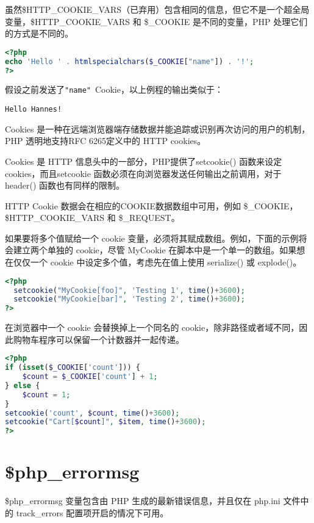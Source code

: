 虽然\$HTTP\_COOKIE\_VARS（已弃用）包含相同的信息，但它不是一个超全局变量，\$HTTP\_COOKIE\_VARS 和 \$\_COOKIE 是不同的变量，PHP 处理它们的方式是不同的。





\begin{lstlisting}[language=PHP]
<?php
echo 'Hello ' . htmlspecialchars($_COOKIE["name"]) . '!';
?>
\end{lstlisting}


假设之前发送了\texttt{"name"}~Cookie，以上例程的输出类似于：

\begin{verbatim}
Hello Hannes!
\end{verbatim}

Cookies 是一种在远端浏览器端存储数据并能追踪或识别再次访问的用户的机制，PHP 透明地支持RFC 6265定义中的 HTTP cookies。

Cookies 是 HTTP 信息头中的一部分，PHP提供了setcookie() 函数来设定 cookies，而且setcookie 函数必须在向浏览器发送任何输出之前调用，对于 header() 函数也有同样的限制。

HTTP Cookie 数据会在相应的COOKIE数据数组中可用，例如 \$\_COOKIE，\$HTTP\_COOKIE\_VARS 和 \$\_REQUEST。

如果要将多个值赋给一个 cookie 变量，必须将其赋成数组。例如，下面的示例将会建立两个单独的 cookie，尽管 MyCookie 在脚本中是一个单一的数组。如果想在仅仅一个 cookie 中设定多个值，考虑先在值上使用 serialize() 或 explode()。

\begin{lstlisting}[language=PHP]
<?php
  setcookie("MyCookie[foo]", 'Testing 1', time()+3600);
  setcookie("MyCookie[bar]", 'Testing 2', time()+3600);
?>
\end{lstlisting}

在浏览器中一个 cookie 会替换掉上一个同名的 cookie，除非路径或者域不同，因此购物车程序可以保留一个计数器并一起传递。

\begin{lstlisting}[language=PHP]
<?php
if (isset($_COOKIE['count'])) {
    $count = $_COOKIE['count'] + 1;
} else {
    $count = 1;
}
setcookie('count', $count, time()+3600);
setcookie("Cart[$count]", $item, time()+3600);
?>
\end{lstlisting}


\section{\$php\_errormsg}

\$php\_errormsg 变量包含由 PHP 生成的最新错误信息，并且仅在 php.ini 文件中的 track\_errors 配置项开启的情况下可用。

